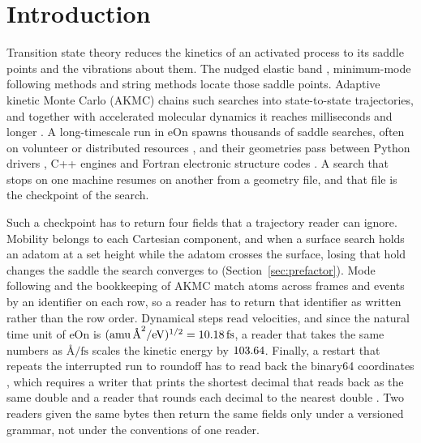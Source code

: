 \documentclass[preprint,12pt]{elsarticle}
\begin{document}
\section{Introduction}\label{sec:introduction} Transition state theory \cite{eyringActivatedComplexChemical1935,vineyardFrequencyFactorsIsotope1957,hanggiReactionrateTheoryFifty1990} reduces the kinetics of an activated process to its saddle points and the vibrations about them.
The nudged elastic band \cite{jonssonNudgedElasticBand1998,henkelmanClimbingImageNudged2000,henkelmanImprovedTangentEstimate2000,asgeirssonNudgedElasticBand2021}, minimum-mode following methods \cite{henkelmanDimerMethodFinding1999,kastnerSuperlinearlyConvergingDimer2008,olsenComparisonMethodsFinding2004,goswamiGaussianProcessSaddle2025} and string methods \cite{eStringMethodStudy2002,petersGrowingStringMethod2004} locate those saddle points.
Adaptive kinetic Monte Carlo (AKMC) chains such searches into state-to-state trajectories, and together with accelerated molecular dynamics it reaches milliseconds and longer \cite{henkelmanLongTimeScale2001,xuAdaptiveKineticMonte2008,voterExtendingTimeScale2002,perezLongtimeDynamicsThrough2016,chillEonSoftwareLong2014}.
A long-timescale run in eOn \cite{chillEonSoftwareLong2014,rohitgoswamiTheochemuieonV3602026} spawns thousands of saddle searches, often on volunteer or distributed resources \cite{andersonBoincSystemPublicresource2004,pedersenDistributedImplementationAdaptive2010}, and their geometries pass between Python drivers \cite{larsenAtomicSimulationEnvironmenta2017,hermesSellaOpensourceAutomationfriendly2022}, C++ engines and Fortran electronic structure codes \cite{kresseEfficiencyAbinitioTotal1996}.
A search that stops on one machine resumes on another from a geometry file, and that file is the checkpoint of the search.

Such a checkpoint has to return four fields that a trajectory reader can ignore.
Mobility belongs to each Cartesian component, and when a surface search holds an adatom at a set height while the adatom crosses the surface, losing that hold changes the saddle the search converges to (Section~\ref{sec:prefactor}).
Mode following and the bookkeeping of AKMC match atoms across frames and events by an identifier on each row, so a reader has to return that identifier as written rather than the row order.
Dynamical steps read velocities, and since the natural time unit of eOn is \((\mathrm{amu}\,\text{\AA}^2/\mathrm{eV})^{1/2}=10.18\,\mathrm{fs}\), a reader that takes the same numbers as \(\text{\AA}/\mathrm{fs}\) scales the kinetic energy by \(103.64\).
Finally, a restart that repeats the interrupted run to roundoff has to read back the binary64 coordinates \cite{ieeecomputersocietyIeeeStandardFloatingpoint2019}, which requires a writer that prints the shortest decimal that reads back as the same double \cite{steeleHowPrintFloatingpoint1990,adamsRyFastFloattostring2018} and a reader that rounds each decimal to the nearest double \cite{clingerHowReadFloating1990}.
Two readers given the same bytes then return the same fields only under a versioned grammar, not under the conventions of one reader.
\end{document}
